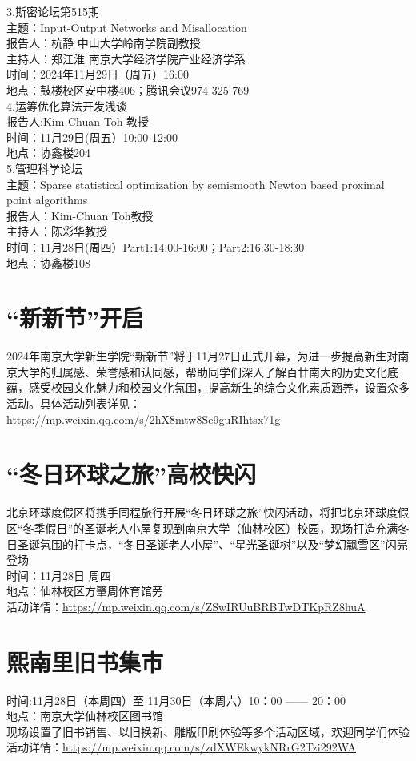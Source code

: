 \documentclass[letterpaper, 12pt]{article}
\begin{document}
\begin{multicols}{2}
3.斯密论坛第515期\\
主题：Input-Output Networks and Misallocation\\
报告人：杭静 中山大学岭南学院副教授\\
主持人：郑江淮 南京大学经济学院产业经济学系\\
时间：2024年11月29日（周五）16:00\\
地点：鼓楼校区安中楼406；腾讯会议974 325 769\\

4.运筹优化算法开发浅谈\\
报告人:Kim-Chuan Toh 教授\\
时间：11月29日(周五）10:00-12:00\\
地点：协鑫楼204\\

5.管理科学论坛\\
主题：Sparse statistical optimization by semismooth Newton based proximal point algorithms\\
报告人：Kim-Chuan Toh教授\\
主持人：陈彩华教授\\
时间：11月28日(周四）Part1:14:00-16:00；Part2:16:30-18:30\\
地点：协鑫楼108\\

\section{“新新节”开启}
2024年南京大学新生学院“新新节”将于11月27日正式开幕，为进一步提高新生对南京大学的归属感、荣誉感和认同感，帮助同学们深入了解百廿南大的历史文化底蕴，感受校园文化魅力和校园文化氛围，提高新生的综合文化素质涵养，设置众多活动。具体活动列表详见：\url{https://mp.weixin.qq.com/s/2hX8mtw8Se9guRIhtsx71g}\\
\section{“冬日环球之旅”高校快闪}
北京环球度假区将携手同程旅行开展“冬日环球之旅”快闪活动，将把北京环球度假区“冬季假日”的圣诞老人小屋复现到南京大学（仙林校区）校园，现场打造充满冬日圣诞氛围的打卡点，“冬日圣诞老人小屋”、“星光圣诞树”以及“梦幻飘雪区”闪亮登场\\
时间：11月28日 周四\\
地点：仙林校区方肇周体育馆旁\\
活动详情：\url{https://mp.weixin.qq.com/s/ZSwIRUuBRBTwDTKpRZ8huA}\\
\section{熙南里旧书集市}
时间:11月28日（本周四）至 11月30日（本周六）10：00 —— 20：00\\
地点：南京大学仙林校区图书馆\\
现场设置了旧书销售、以旧换新、雕版印刷体验等多个活动区域，欢迎同学们体验\\
活动详情：\url{https://mp.weixin.qq.com/s/zdXWEkwykNRrG2Tzi292WA}\\

\end{multicols}
\end{document}
